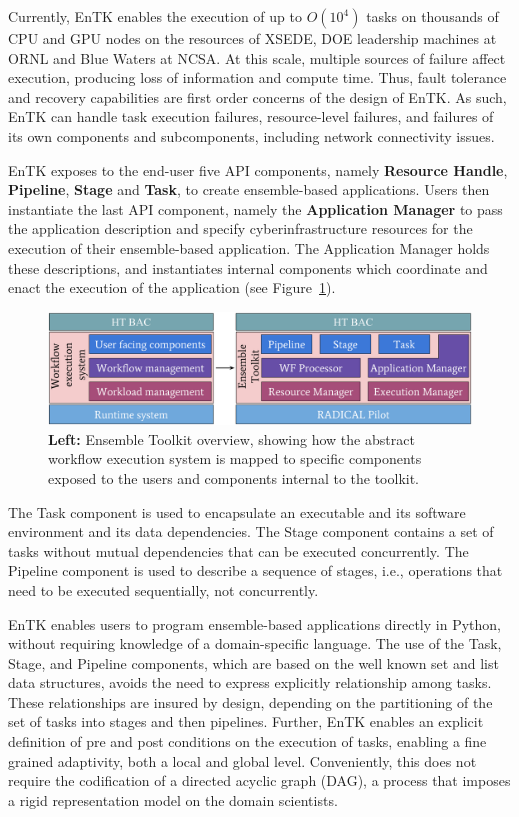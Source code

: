 Currently, EnTK enables the execution of up to \(O(10^4)\) tasks on thousands
of CPU and GPU nodes on the resources of XSEDE, DOE leadership machines
at ORNL and Blue Waters at NCSA. At this scale, multiple sources of failure
affect execution, producing loss of information and compute time. Thus, fault
tolerance and recovery capabilities are first order concerns of the design of
EnTK\@. As such, EnTK can handle task execution failures, resource-level
failures, and failures of its own components and subcomponents, including
network connectivity issues.

EnTK exposes to the end-user five API components, namely \textbf{Resource Handle}, 
\textbf{Pipeline}, \textbf{Stage} and \textbf{Task}, to create ensemble-based applications. 
Users then instantiate the last API component, namely the \textbf{Application Manager}  
to pass the application description and specify cyberinfrastructure resources for the 
execution of their ensemble-based application. The Application Manager holds these 
descriptions, and instantiates internal components which coordinate and enact the 
execution of the application (see Figure~\ref{fig:entk_arch}).

\begin{figure}
  \centering
  \includegraphics[width=\columnwidth]{FIGURES/entk_overview.pdf}
  \caption{\textbf{Left:} Ensemble Toolkit overview, showing how the abstract
           workflow execution system is mapped to specific components exposed
           to the users and components internal to the
           toolkit.}\label{fig:entk_arch}
\end{figure}


The Task component is used to encapsulate an executable and its software 
environment and its data dependencies. The Stage component contains a set 
of tasks without mutual dependencies that can be executed concurrently. 
The Pipeline component is used to describe a sequence of
stages, i.e., operations that need to be executed sequentially, not concurrently.

EnTK enables users to program ensemble-based applications directly in Python,
without requiring knowledge of a domain-specific language. The use of the
Task, Stage, and Pipeline components, which are based on the well known set
and list data structures, avoids the need to express explicitly relationship
among tasks. These relationships are insured by design, depending on the
partitioning of the set of tasks into stages and then pipelines. Further,
EnTK enables an explicit definition of pre and post conditions on the
execution of tasks, enabling a fine grained adaptivity, both a local and global 
level. Conveniently, this does not require the codification of a directed acyclic 
graph (DAG), a process that imposes a rigid representation model on the domain scientists.

